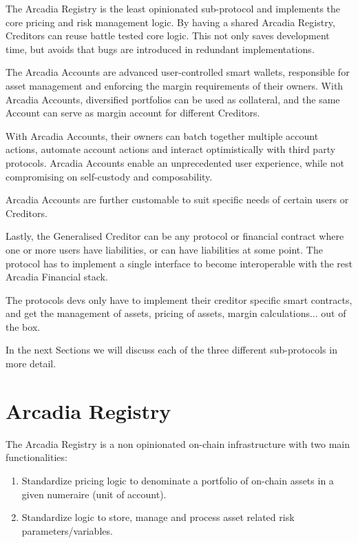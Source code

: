 \documentclass[sigconf,nonacm]{acmart}
\begin{document}

The Arcadia Registry is the least opinionated sub-protocol and implements the core pricing and risk management logic.
By having a shared Arcadia Registry, Creditors can reuse battle tested core logic.
This not only saves development time, but avoids that bugs are introduced in redundant implementations.

The Arcadia Accounts are advanced user-controlled smart wallets, responsible for asset management and enforcing the margin requirements of their owners.
With Arcadia Accounts, diversified portfolios can be used as collateral, and the same Account can serve as margin account for different Creditors.

With Arcadia Accounts, their owners can batch together multiple account actions, automate account actions and interact optimistically with third party protocols.
Arcadia Accounts enable an unprecedented user experience, while not compromising on self-custody and composability.

Arcadia Accounts are further customable to suit specific needs of certain users or Creditors.

Lastly, the Generalised Creditor can be any protocol or financial contract where one or more users have liabilities, or can have liabilities at some point.
The protocol has to implement a single interface to become interoperable with the rest Arcadia Financial stack.

The protocols devs only have to implement their creditor specific smart contracts,
and get the management of assets, pricing of assets, margin calculations... out of the box.

In the next Sections we will discuss each of the three different sub-protocols in more detail.

\section{Arcadia Registry}
\label{sec:arcadia-registry}

The Arcadia Registry is a non opinionated on-chain infrastructure with two main functionalities:
\begin{enumerate}
    \item Standardize pricing logic to denominate a portfolio of on-chain assets in a given numeraire (unit of account).
    \item Standardize logic to store, manage and process asset related risk parameters/variables.
\end{enumerate}
\end{document}
